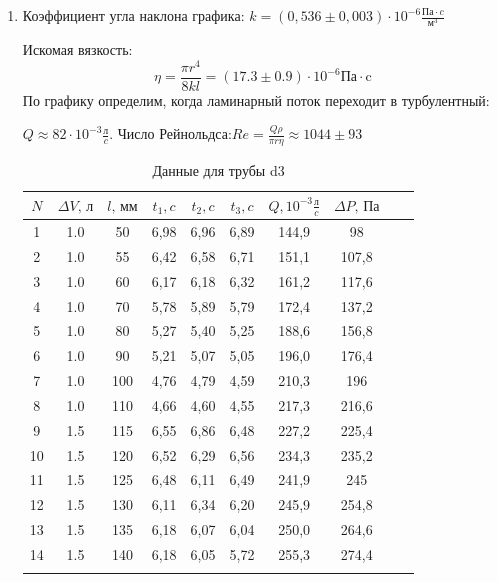 \documentclass[a4paper, 12pt]{article}%
\begin{document}
\begin{enumerate}
	\item Коэффициент угла наклона графика: $k = (0,536 \pm 0,003)\cdot 10^{-6} \frac{\text{Па} \cdot c}{\text{м}^3}$
	
	Искомая вязкость:
	\[
	\eta = \frac{\pi r^4 }{8 k l} = (17.3 \pm 0.9) \cdot 10^{-6} \text{Па} \cdot \text{c}
	\]
	По графику определим, когда ламинарный поток переходит в турбулентный:
	
	$Q \approx 82 \cdot 10^{-3} \frac{\text{л}}{c}$.
	Число Рейнольдса:$Re = \frac{Q \rho}{\pi r \eta} \approx 1044 \pm 93$ 
	
	
	\newpage
		\begin{longtable}{|c|c|c|c|c|c|c|c|c|c|} \hline
		$N$ &  $\Delta V, \, \text{л}$  &   $l,\, \text{мм}$ &     $t_1, c$ &     $t_2, c$ &     $t_3, c$ &    $ Q, 10^{-3} \frac{\text{л}}{c} $ & $\Delta P, \, \text{Па}$\\ \hline
		1& 1.0   &  50 &  6,98 &  6,96 &  6,89 &    144,9 &   98\\ \hline
		2&   1.0 &  55 &  6,42 &  6,58 &  6,71 &    151,1 &  107,8\\ \hline
		3 &   1.0 &  60 &  6,17 &  6,18 &  6,32 &   161,2 &   117,6 \\ \hline
		4 &   1.0 &  70 &  5,78 &  5,89 &  5,79 &    172,4 &   137,2 \\ \hline
		5 &   1.0 &  80 &  5,27 &  5,40 &  5,25 &    188,6 &   156,8 \\ \hline
		6 &   1.0 &  90 &  5,21 &  5,07 & 5,05 &    196,0 &   176,4 \\ \hline
		7 &   1.0 &  100 &  4,76 &  4,79 &  4,59 &  210,3 &   196 \\\hline
		8 &   1.0 &  110&  4,66 & 4,60 &  4,55 &    217,3 &   216,6 \\ \hline
		9 &   1.5 &  115 &  6,55 &  6,86 &  6,48 &    227,2 &   225,4 \\ \hline
		10 &  1.5 &  120 &  6,52 &  6,29 &  6,56 &   234,3 &  235,2 \\ \hline
		11 &  1.5 &  125 &  6,48 &  6,11 &  6,49 &    241,9 &  245 \\ \hline
		12 &  1.5 &  130 &  6,11 &  6,34 &  6,20 &  245,9 &  254,8 \\ \hline
		13 &  1.5 &  135 &  6,18 &  6,07 &  6,04 &   250,0 &  264,6 \\ \hline
		14&  1.5  &  140 & 6,18 &  6,05 &  5,72 &    255,3 &  274,4 \\ \hline
		\caption{ Данные для трубы d3}
	\end{longtable}
	


\end{enumerate}
\end{document}
